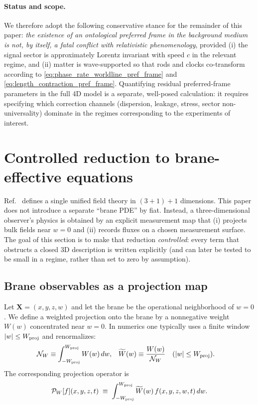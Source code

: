 \documentclass[11pt]{article}
\begin{document}
\paragraph{Status and scope.}
We therefore adopt the following conservative stance for the remainder of this paper:
\emph{the existence of an ontological preferred frame in the background medium is not, by itself,
a fatal conflict with relativistic phenomenology}, provided (i) the signal sector is approximately
Lorentz invariant with speed $c$ in the relevant regime, and (ii) matter is wave-supported so that
rods and clocks co-transform according to \eqref{eq:phase_rate_worldline_pref_frame} and
\eqref{eq:length_contraction_pref_frame}. Quantifying residual preferred-frame parameters in the
full 4D model is a separate, well-posed calculation: it requires specifying which correction channels
(dispersion, leakage, stress, sector non-universality) dominate in the regimes corresponding to the
experiments of interest.

\section{Controlled reduction to brane-effective equations}
\label{sec:brane_reduction}

Ref.~\cite{norris2026_4d_model} defines a single unified field theory in $(3+1)+1$ dimensions.
This paper does not introduce a separate ``brane PDE'' by fiat. Instead, a
three-dimensional observer's physics is obtained by an explicit measurement map
that (i) projects bulk fields near $w=0$ and (ii) records fluxes on a chosen
measurement surface.  The goal of this section is to make that reduction
\emph{controlled}: every term that obstructs a closed $3$D description is written
explicitly (and can later be tested to be small in a regime, rather than set to
zero by assumption).

\subsection{Brane observables as a projection map}
\label{sec:brane_projection}

Let $\mathbf{X}=(x,y,z,w)$ and let the brane be the operational neighborhood of
$w=0$.  We define a weighted projection onto the brane by a nonnegative weight
$W(w)$ concentrated near $w=0$.  In numerics one typically uses a finite window
$|w|\le W_{\rm proj}$ and renormalizes:
\begin{align}
\mathcal{N}_W &\equiv \int_{-W_{\rm proj}}^{W_{\rm proj}} W(w)\,dw, &
\widetilde W(w) &\equiv \frac{W(w)}{\mathcal{N}_W}\quad (|w|\le W_{\rm proj}).
\end{align}
The corresponding projection operator is
\begin{align}
\mathcal{P}_W[f](x,y,z,t) \;\equiv\; \int_{-W_{\rm proj}}^{W_{\rm proj}} \widetilde W(w)\,
f(x,y,z,w,t)\,dw.
\end{align}
\end{document}
